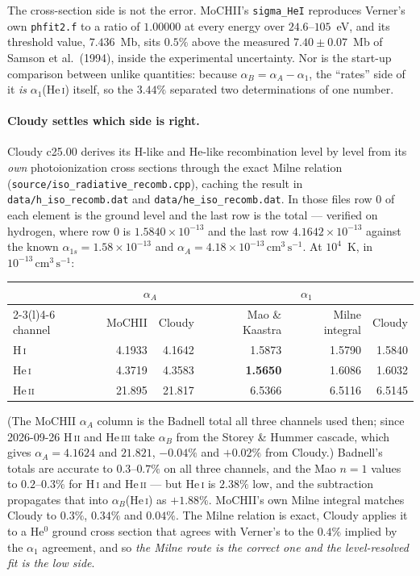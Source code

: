 \documentclass[english,a4paper]{my_memo}
\newcommand{\code}[1]{\texttt{#1}}
\newcommand{\cmc}{\mathrm{cm^{3}\,s^{-1}}}
\begin{document}
The cross-section side is not the error.  MoCHII's \code{sigma\_HeI}
reproduces Verner's own \code{phfit2.f} to a ratio of $1.00000$ at every
energy over $24.6$--$105$~eV, and its threshold value, $7.436$~Mb, sits
$0.5\%$ above the measured $7.40\pm0.07$~Mb of Samson et al.\ (1994),
inside the experimental uncertainty.  Nor is the start-up comparison between
unlike quantities: because $\alpha_B = \alpha_A - \alpha_1$, the ``rates''
side of it \emph{is} $\alpha_1$(He\,\textsc{i}) itself, so the $3.44\%$
separated two determinations of one number.

\paragraph{Cloudy settles which side is right.}  Cloudy c25.00 derives its
H-like and He-like recombination level by level from its \emph{own}
photoionization cross sections through the exact Milne relation
(\code{source/iso\_radiative\_recomb.cpp}), caching the result in
\code{data/h\_iso\_recomb.dat} and \code{data/he\_iso\_recomb.dat}.  In those
files row 0 of each element is the ground level and the last row is the
total --- verified on hydrogen, where row 0 is $1.5840{\times}10^{-13}$ and
the last row $4.1642{\times}10^{-13}$ against the known
$\alpha_{1s} = 1.58{\times}10^{-13}$ and
$\alpha_A = 4.18{\times}10^{-13}\,\cmc$.  At $10^4$~K, in
$10^{-13}\,\cmc$:
\begin{center}\small
\begin{tabular}{@{}lrrrrr@{}}
\toprule
& \multicolumn{2}{c}{$\alpha_A$} & \multicolumn{3}{c}{$\alpha_1$} \\
\cmidrule(r){2-3}\cmidrule(l){4-6}
channel & MoCHII & Cloudy & Mao \& Kaastra & Milne integral & Cloudy \\
\midrule
H\,\textsc{i}   & 4.1933 & 4.1642 & 1.5873          & 1.5790 & 1.5840 \\
He\,\textsc{i}  & 4.3719 & 4.3583 & \textbf{1.5650} & 1.6086 & 1.6032 \\
He\,\textsc{ii} & 21.895 & 21.817 & 6.5366          & 6.5116 & 6.5145 \\
\bottomrule
\end{tabular}
\end{center}
(The MoCHII $\alpha_A$ column is the Badnell total all three channels used
then; since 2026-09-26 H\,\textsc{ii} and He\,\textsc{iii} take $\alpha_B$
from the Storey \& Hummer cascade, which gives $\alpha_A = 4.1624$ and
$21.821$, $-0.04\%$ and $+0.02\%$ from Cloudy.)
Badnell's totals are accurate to $0.3$--$0.7\%$ on all three channels, and
the Mao $n{=}1$ values to $0.2$--$0.3\%$ for H\,\textsc{i} and
He\,\textsc{ii} --- but He\,\textsc{i} is $2.38\%$ low, and the subtraction
propagates that into $\alpha_B$(He\,\textsc{i}) as $+1.88\%$.  MoCHII's own
Milne integral matches Cloudy to $0.3\%$, $0.34\%$ and $0.04\%$.  The Milne
relation is exact, Cloudy applies it to a He$^0$ ground cross section that
agrees with Verner's to the $0.4\%$ implied by the $\alpha_1$ agreement, and
so \emph{the Milne route is the correct one and the level-resolved fit is
the low side}.
\end{document}
